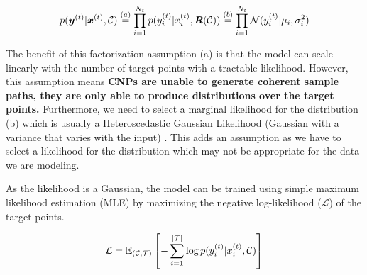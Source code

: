 \documentclass[../../main.tex]{subfiles}
\begin{document}
\begin{align}
    p(\bm{y}^{(t)} | \bm{x}^{(t)}, \mathcal{C}) &\stackrel{(a)}{=} \prod_{i=1}^{N_t} p({y}_i^{(t)} | {x}_i^{(t)}, \bm{R}(\mathcal{C}))  \stackrel{(b)}{=}
    \prod_{i=1}^{N_t} \mathcal{N}({y}_i^{(t)} | \mu_i, \sigma_i^2) \\
\end{align}

The benefit of this factorization assumption (a) is that the model can scale linearly with the number of target points with a tractable likelihood. However, this assumption means
\textbf{CNPs are unable to generate coherent sample paths, they are only able to produce distributions over the target points.} Furthermore, we need to select a marginal likelihood for the distribution (b) which is usually a Heteroscedastic Gaussian Likelihood (Gaussian with a variance that varies with the input) \parencite{garnelo2018conditional}. This adds an assumption as we have to select a likelihood for the distribution which may not be appropriate for the data we are modeling.


As the likelihood is a Gaussian, the model can be trained using simple maximum likelihood estimation (MLE) by maximizing the negative log-likelihood ($\mathcal{L}$) of the target points.

\begin{equation}
    \mathcal{L} = \mathbb{E}_{(\mathcal{C}, \mathcal{T})} \left[- \sum_{i=1}^{|\mathcal{T}|} \log p({y}_i^{(t)} | {x}_i^{(t)}, \mathcal{C})\right]
\end{equation}



\end{document}
